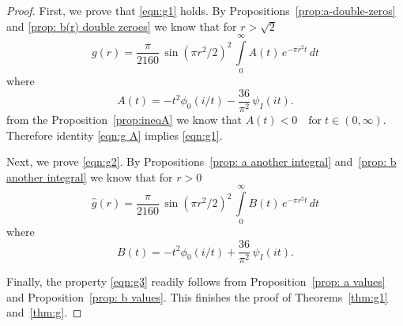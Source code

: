 \begin{proof}
First, we prove that \eqref{eqn:g1} holds. By Propositions~\ref{prop:a-double-zeros} and \ref{prop: b(r) double zeroes} we know that for $r>\sqrt{2}$
\begin{equation}\label{eqn:g A} g(r)=\frac{\pi}{2160}\,\sin(\pi r^2/2)^2\,\int\limits_0^\infty A(t)\,e^{-\pi r^2 t}\,dt\end{equation}
where $$A(t)=-t^2\phi_0(i/t)-\frac{36}{\pi^2}\,\psi_I(it).$$
from the Proposition~\ref{prop:ineqA} we know that $A(t)<0\quad\mbox{for}\;t\in(0,\infty).$
Therefore identity \eqref{eqn:g A} implies \eqref{eqn:g1}.

Next, we prove \eqref{eqn:g2}. By Propositions~\ref{prop: a another integral} and~\ref{prop: b another integral} we know that for $r>0$
\begin{equation}\label{eqn:g B} \widehat{g}(r)=\frac{\pi}{2160}\,\sin(\pi r^2/2)^2\,\int\limits_0^\infty B(t)\,e^{-\pi r^2 t}\,dt\end{equation}
where $$B(t)=-t^2\phi_0(i/t)+\frac{36}{\pi^2}\,\psi_I(it).$$


Finally, the property \eqref{eqn:g3} readily follows from Proposition~\ref{prop: a values} and Proposition~\ref{prop: b values}.
This finishes the proof of Theorems~\ref{thm:g1} and~\ref{thm:g}.
\end{proof}
